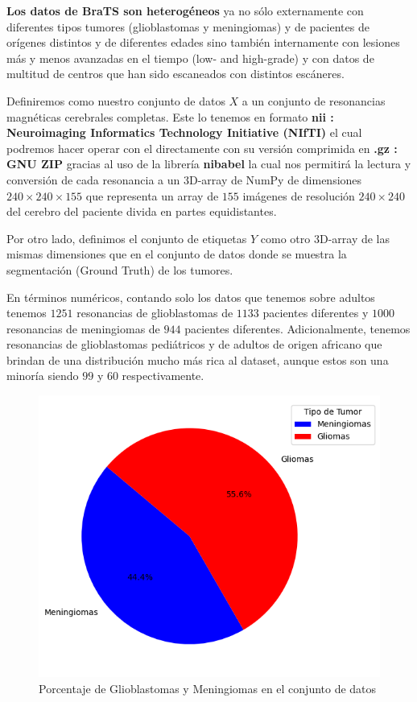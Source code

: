 \textbf{Los datos de BraTS son heterogéneos} ya no sólo externamente con diferentes tipos tumores (glioblastomas y meningiomas) y de pacientes de orígenes distintos y de diferentes edades sino también internamente con lesiones más y menos avanzadas en el tiempo (low- and high-grade) y con datos de multitud de centros que han sido escaneados con distintos escáneres.

Definiremos como nuestro conjunto de datos \textbf{$X$} a un conjunto de resonancias magnéticas cerebrales completas. Este lo tenemos en formato \textbf{nii : Neuroimaging Informatics Technology Initiative (NIfTI)} el cual podremos hacer operar con el directamente con su versión comprimida en \textbf{.gz : GNU ZIP} gracias al uso de la librería \textbf{nibabel} la cual nos permitirá la lectura y conversión de cada resonancia a un 3D-array de NumPy de dimensiones $240 \times 240 \times 155$ que representa un array de $155$ imágenes de resolución $240 \times 240$ del cerebro del paciente divida en partes equidistantes. 

Por otro lado, definimos el conjunto de etiquetas $Y$ como otro 3D-array de las mismas dimensiones que en el conjunto de datos donde se muestra la segmentación (Ground Truth) de los tumores.

En términos numéricos, contando solo los datos que tenemos sobre adultos tenemos $1251$ resonancias de glioblastomas de $1133$ pacientes diferentes y $1000$ resonancias de meningiomas de $944$ pacientes diferentes. Adicionalmente, tenemos resonancias de glioblastomas pediátricos y de adultos de origen africano que brindan de una distribución mucho más rica al dataset, aunque estos son una minoría siendo $99$ y $60$ respectivamente. 

\begin{figure}[!h]
	\centering
	\includegraphics[width=0.8\linewidth]{imagenes/porcentajeGLIvsMEN.png}
	\caption{Porcentaje de Glioblastomas y Meningiomas en el conjunto de datos}
\end{figure}

